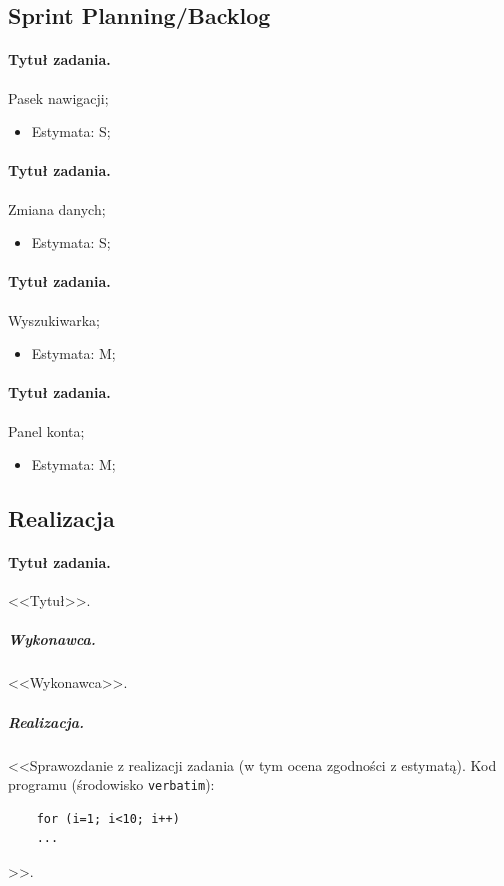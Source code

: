 \documentclass[a4paper]{article}
\begin{document}
	\subsection{Sprint Planning/Backlog}
	
	\paragraph{Tytuł zadania.} Pasek nawigacji;
	\begin{itemize}
		\item Estymata: S;
	\end{itemize}
	
	\paragraph{Tytuł zadania.} Zmiana danych;
	\begin{itemize}
		\item Estymata: S;
	\end{itemize}
	
	\paragraph{Tytuł zadania.} Wyszukiwarka;
	\begin{itemize}
		\item Estymata: M;
	\end{itemize}
	
	\paragraph{Tytuł zadania.} Panel konta;
	\begin{itemize}
		\item Estymata: M;
	\end{itemize}
	
	\subsection{Realizacja}
	
	\paragraph{Tytuł zadania.} <<Tytuł>>.
	\subparagraph{Wykonawca.} <<Wykonawca>>.
	\subparagraph{Realizacja.} <<Sprawozdanie z realizacji zadania (w tym ocena zgodności z estymatą). Kod programu (środowisko \texttt{verbatim}): \begin{verbatim}
	for (i=1; i<10; i++)
	...
	\end{verbatim}>>.
	
\end{document}
